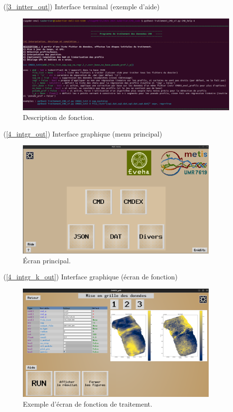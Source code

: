 \documentclass[12pt]{article}
\begin{document}
    \label{3_intter_in} (\ref{3_intter_out}) Interface terminal (exemple d'aide)
    \begin{figure}[ht!]
        \centering
        \includegraphics[width=\textwidth]{Images/IntTer.png}
        \caption{Description de fonction.}
    \end{figure}

\newpage
    \label{4_intgr_in} (\ref{4_intgr_out}) Interface graphique (menu principal)
    \begin{figure}[ht!]
        \centering
        \includegraphics[width=0.9\textwidth]{Images/IntGraph_mm.png}
        \caption{Écran principal.}
    \end{figure}

    \label{4_intgr_k_in} (\ref{4_intgr_k_out}) Interface graphique (écran de fonction)
    \begin{figure}[ht!]
        \centering
        \includegraphics[width=0.9\textwidth]{Images/IntGraph_CMDEX_k.png}
        \caption{Exemple d'écran de fonction de traitement.}
    \end{figure}
\end{document}
